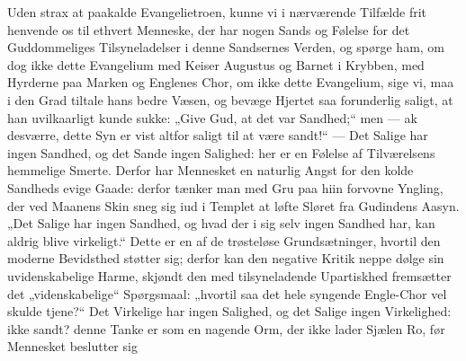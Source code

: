 \documentclass[12pt,a4paper]{book}
\begin{document}
Uden strax at paakalde Evangelietroen, kunne vi i nærværende Tilfælde frit
henvende os til ethvert Menneske, der har nogen Sands og Følelse for det
Guddommeliges Tilsyneladelser i denne Sandsernes Verden, og spørge ham, om dog
ikke dette Evangelium med Keiser Augustus og Barnet i Krybben, med Hyrderne paa
Marken og Englenes Chor, om ikke dette Evangelium, sige vi, maa i den Grad
%
tiltale hans bedre Væsen, og bevæge Hjertet saa forunderlig saligt, at han
uvilkaarligt kunde sukke: „Give Gud, at det var Sandhed;“ men --- ak desværre,
dette Syn er vist altfor saligt til at være sandt!“ --- Det Salige har ingen
Sandhed, og det Sande ingen Salighed: her er en Følelse af Tilværelsens hemmelige
Smerte. Derfor har Mennesket en naturlig Angst for den kolde Sandheds evige
Gaade: derfor tænker man med Gru paa hiin forvovne Yngling, der ved Maanens Skin
sneg sig iud i Templet at løfte Sløret fra Gudindens Aasyn. „Det Salige har ingen
Sandhed, og hvad der i sig selv ingen Sandhed har, kan
aldrig blive virkeligt.“ Dette er en af de trøsteløse Grundsætninger, hvortil den
moderne Bevidsthed støtter sig; derfor kan den negative Kritik neppe dølge sin
uvidenskabelige Harme, skjøndt den med tilsyneladende Upartiskhed fremsætter det
„videnskabelige“ Spørgsmaal: „hvortil saa det hele syngende Engle-Chor vel skulde
tjene?“ Det Virkelige har ingen Salighed, og det Salige ingen Virkelighed: ikke sandt?
denne Tanke er som en nagende Orm, der ikke lader Sjælen Ro, før Mennesket beslutter sig
\end{document}

